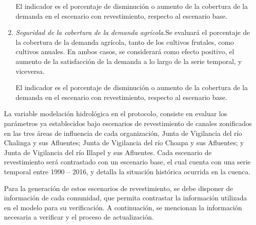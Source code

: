 \documentclass[]{article}
\begin{document}
\begin{enumerate}
El indicador es el porcentaje de disminución o aumento de la cobertura de la 	demanda en el escenario con revestimiento, respecto al escenario base.


\item \textit{Seguridad de la cobertura de la demanda agrícola}.Se evaluará el porcentaje de la cobertura de la demanda agrícola, tanto de los cultivos frutales, como cultivos anuales. En ambos casos, se considerará como efecto positivo, el aumento de la satisfacción de la demanda a lo largo de la serie temporal, y viceversa.

El indicador es el porcentaje de disminución o aumento de la cobertura de la 	demanda en el escenario con revestimiento, respecto al escenario base.

\end{enumerate}

La variable modelación hidrológica en el protocolo, consiste en evaluar los parámetros ya establecidos bajo escenarios de revestimiento de canales zonificados en las tres áreas de influencia de cada organización, Junta de Vigilancia del río Chalinga y sus Afluentes; Junta de Vigilancia del río Choapa y sus Afluentes; y Junta de Vigilancia del río Illapel y sus Afluentes. Cada escenario de revestimiento será contrastado con un escenario base, el cual cuenta con una serie temporal entre 1990 – 2016, y detalla la situación histórica ocurrida en la cuenca.

Para la generación de estos escenarios de revestimiento, se debe disponer de información de cada comunidad, que permita contrastar la información utilizada en el modelo para su verificación. A continuación, se mencionan la información necesaria a verificar y el proceso de actualización.
\end{document}
